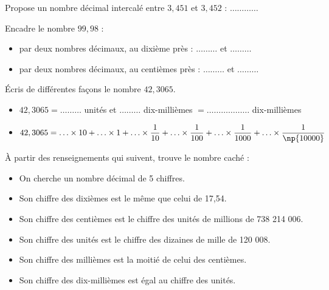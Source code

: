 \begin{pageParcoursd} 


Propose un nombre décimal intercalé entre $3,451$ et $3,452$ : $\ldots \ldots\ldots \ldots$


Encadre le nombre $99,98$ :
\begin{itemize}
\item par deux nombres décimaux, au dixième près : $\ldots\ldots\ldots$ et $\ldots\ldots\ldots$ \vspace{0.3cm}
\item par deux nombres décimaux, au centièmes près : $\ldots\ldots\ldots$ et $\ldots\ldots\ldots$
\end{itemize}
 
 


Écris de différentes façons le nombre $42,3065$.

\begin{itemize}
\item $42,3065 = \ldots\ldots\ldots$ unités et $\ldots\ldots\ldots$ dix-millièmes   $ = \ldots\ldots\ldots \ldots\ldots\ldots$ dix-millièmes\vspace{0.3cm}
\item $42,3065 = \ldots\times 10 + \ldots\times 1 + \ldots\times \dfrac{1}{10} +  \ldots\times \dfrac{1}{100} +  \ldots\times \dfrac{1}{1000} + \ldots\times \dfrac{1}{\np{10000}}$ \vspace{0.3cm}
\end{itemize}



À partir des renseignements qui suivent, trouve le nombre caché :

\begin{itemize}
\item  On cherche un nombre décimal de 5 chiffres.
\item  Son chiffre des dixièmes est le même que celui de 17,54.
\item  Son chiffre des centièmes est le chiffre des unités de millions de 738 214 006.
\item  Son chiffre des unités est le chiffre des dizaines de mille de 120 008.
\item  Son chiffre des millièmes est la moitié de celui des centièmes.
\item  Son chiffre des dix-millièmes est égal au chiffre des unités.
\end{itemize}


\end{pageParcoursd}
